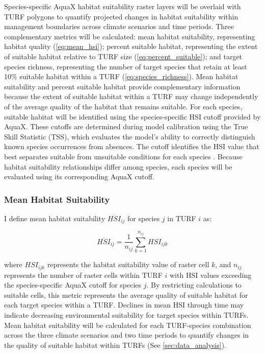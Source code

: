 \documentclass[12pt]{article}
\begin{document}
Species-specific AquaX habitat suitability raster layers will be overlaid with TURF polygons to quantify projected changes in habitat suitability within management boundaries across climate scenarios and time periods. Three complementary metrics will be calculated: mean habitat suitability, representing habitat quality (\autoref{eq:mean_hsi}); percent suitable habitat, representing the extent of suitable habitat relative to TURF size (\autoref{eq:percent_suitable}); and target species richness, representing the number of target species that retain at least 10\% suitable habitat within a TURF (\autoref{eq:species_richness}). Mean habitat suitability and percent suitable habitat provide complementary information because the extent of suitable habitat within a TURF may change independently of the average quality of the habitat that remains suitable. For each species, suitable habitat will be identified using the species-specific HSI cutoff provided by AquaX. These cutoffs are determined during model calibration using the True Skill Statistic (TSS), which evaluates the model’s ability to correctly distinguish known species occurrences from absences. The cutoff identifies the HSI value that best separates suitable from unsuitable conditions for each species \citep{Reygondeau2026}. Because habitat suitability relationships differ among species, each species will be evaluated using its corresponding AquaX cutoff.


\subsubsection{Mean Habitat Suitability}

I define mean habitat suitability $\overline{HSI}_{ij}$ for species $j$ in TURF $i$ as:

\begin{equation}
    \overline{HSI}_{ij} = \frac{1}{n_{ij}} \sum_{k=1}^{n_{ij}} HSI_{ijk}
    \label{eq:mean_hsi}
\end{equation}

where $HSI_{ijk}$ represents the habitat suitability value of raster cell $k$, and $n_{ij}$ represents the number of raster cells within TURF $i$ with HSI values exceeding the species-specific AquaX cutoff for species $j$. By restricting calculations to suitable cells, this metric represents the average quality of suitable habitat for each target species within a TURF. Declines in mean HSI through time may indicate decreasing environmental suitability for target species within TURFs. Mean habitat suitability will be calculated for each TURF-species combination across the three climate scenarios and two time periods to quantify changes in the quality of suitable habitat within TURFs (See \autoref{sec:data_analysis}). 
\end{document}

